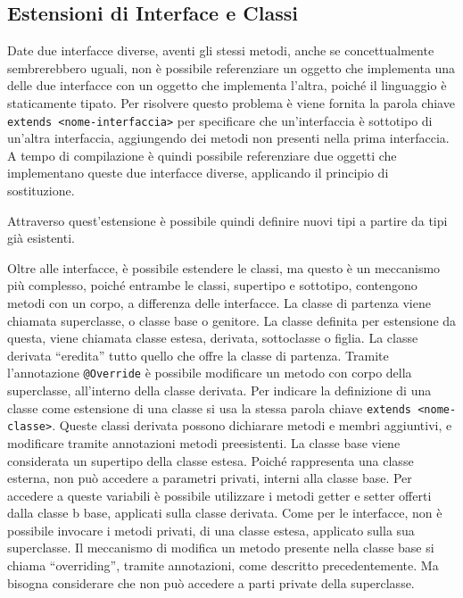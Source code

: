 \documentclass{article}
\numberwithin{equation}{subsection}
\begin{document}
\subsection{Estensioni di Interface e Classi}

Date due interfacce diverse, aventi gli stessi metodi, anche se concettualmente sembrerebbero uguali, non è possibile referenziare un oggetto che implementa una delle due interfacce 
con un oggetto che implementa l'altra, poiché il linguaggio è staticamente tipato. Per risolvere questo problema è viene fornita la parola chiave \verb|extends <nome-interfaccia>| per 
specificare che un'interfaccia è sottotipo di un'altra interfaccia, aggiungendo dei metodi non presenti nella prima interfaccia. A tempo di compilazione è quindi possibile 
referenziare due oggetti che implementano queste due interfacce diverse, applicando il principio di sostituzione. 

Attraverso quest'estensione è possibile quindi definire nuovi tipi a partire da tipi già esistenti. 


Oltre alle interfacce, è possibile estendere le classi, ma questo è un meccanismo più complesso, poiché entrambe le classi, supertipo e sottotipo, contengono metodi con un corpo, 
a differenza delle interfacce. La classe di partenza viene chiamata superclasse, o classe base o genitore. La classe definita per estensione da questa, viene chiamata classe estesa, 
derivata, sottoclasse o figlia. 
La classe derivata ``eredita'' tutto quello che offre la classe di partenza. Tramite l'annotazione \verb|@Override| è possibile modificare un metodo con corpo della superclasse, 
all'interno della classe derivata. 
Per indicare la definizione di una classe come estensione di una classe si usa la stessa parola chiave \verb|extends <nome-classe>|. Queste classi derivata possono dichiarare 
metodi e membri aggiuntivi, e modificare tramite annotazioni metodi preesistenti. La classe base viene considerata un supertipo della classe estesa. Poiché rappresenta una classe 
esterna, non può accedere a parametri privati, interni alla classe base. Per accedere a queste variabili è possibile utilizzare i metodi getter e setter offerti dalla classe b
base, applicati sulla classe derivata. 
Come per le interfacce, non è possibile invocare i metodi privati, di una classe estesa, applicato sulla sua superclasse. 
Il meccanismo di modifica un metodo presente nella classe base si chiama ``overriding'', tramite annotazioni, come descritto precedentemente. Ma bisogna considerare che non 
può accedere a parti private della superclasse. 

\end{document}
